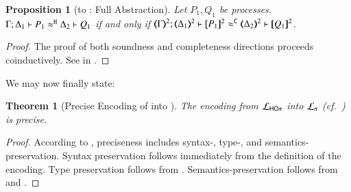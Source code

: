 \documentclass[preprint,11pt]{elsarticle}
\newtheorem{proposition}{Proposition}[section]
\newtheorem{theorem}{Theorem}[section]
\begin{document}
{{\begin{proposition}[\HOp to \sessp: Full Abstraction]%
	\label{prop:fulla_HOp_to_p}
	Let $P_1, Q_1$ be \HOp processes.
	$\Gamma; \Delta_1 \vdash P_1 \approx^\mathtt{H} \Delta_2 \vdash Q_1$
	if and only if
	$\horel{\tmap{\Gamma}{2}}{\tmap{\Delta_1}{2}}{\pmap{P_1}{2}}{\fwb}{\tmap{\Delta_2}{2}}{\pmap{Q_1}{2}}$.
\end{proposition}

\begin{proof}
The proof of both soundness and completeness directions proceeds coinductively.
See  in .
\end{proof}

We may now finally state:


\begin{theorem}[Precise Encoding of \HOp into \sessp]
\label{f:enc:hotopi}
The encoding from $\mathcal{L}_{\mathsf{HO}\pi}$ into $\mathcal{L}_{\pi}$ (cf.~)
is precise. 
\end{theorem}

\begin{proof}
According to , preciseness includes syntax-, type-, and semantics-preservation. 
Syntax preservation follows immediately from the definition of the encoding. 
Type preservation follows from 
.
Semantics-preservation follows from 	
 and 
.
\end{proof}

}}
\end{document}
